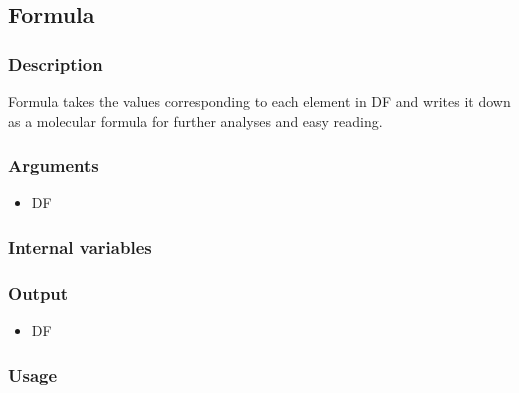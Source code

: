 \subsection{Formula}
\subsubsection{Description}
Formula takes the values corresponding to each element in DF and writes it down as a molecular formula for further analyses and easy reading.
\subsubsection{Arguments}
\begin{itemize}
\item DF
\end{itemize}
\subsubsection{Internal variables}
\subsubsection{Output}
\begin{itemize}
\item DF
\end{itemize}
\subsubsection{Usage}
